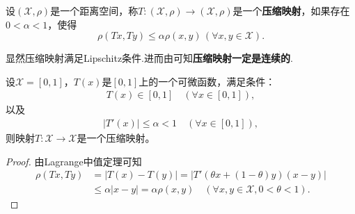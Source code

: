 \documentclass[../../main.tex]{subfiles}
\begin{document}
\begin{definition}
设$(\mathscr{X},\rho)$是一个距离空间，称$T:(\mathscr{X},\rho) \to (\mathscr{X},\rho)$是一个\textbf{压缩映射}，如果存在$0 < \alpha < 1$，使得$$\rho(Tx,Ty) \leqslant \alpha\rho(x,y)\,(\forall x,y \in \mathscr{X}).$$
\end{definition}
\begin{note}
显然压缩映射满足Lipschitz条件.进而由可知\textbf{压缩映射一定是连续的}.
\end{note}

\begin{example}
设$\mathscr{X} = [0,1]$，$T(x)$是$[0,1]$上的一个可微函数，满足条件：
\begin{align}
\label{eq:1.1.8}
T(x) \in [0,1] \quad (\forall x \in [0,1]),
\end{align}
以及
\begin{align}
\label{eq:1.1.9}
|T'(x)| \leqslant \alpha < 1 \quad (\forall x \in [0,1]),
\end{align}
则映射$T:\mathscr{X} \to \mathscr{X}$是一个压缩映射。
\end{example}
\begin{proof}
由Lagrange中值定理可知
\begin{align*}
\rho(Tx,Ty) &= |T(x) - T(y)|= |T'(\theta x + (1 - \theta)y)(x - y)| \\
&\leqslant \alpha|x - y| = \alpha\rho(x,y) \quad (\forall x,y \in \mathscr{X}, 0 < \theta < 1).
\end{align*}
\end{proof}
\end{document}
